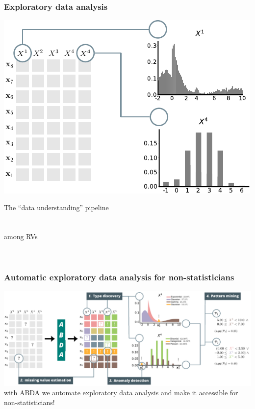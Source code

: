 \documentclass[xcolor={usenames,dvipsnames,svgnames}, compress, aspectratio=169, 11pt]{beamer}
\begin{document}
\begin{frame}[t, htt=bgrey2]
  \frametitle{Exploratory data analysis}

  \large
  \begin{minipage}[t]{0.6\linewidth}
    \includegraphics[width=.99\linewidth]{figures/abda-hist-type}
  \end{minipage}\hfill\begin{minipage}[t]{0.4\linewidth}
    \vspace{-150pt}
    {The ``data understanding'' pipeline}\\[5pt]
    \\
    \\
     among
    RVs\\
    \\
    \\
  \end{minipage}  
\end{frame}


\begin{frame}[t, htt=mpigreen]
  \frametitle{Automatic exploratory data analysis for non-statisticians}

  \includegraphics[width=1.04\linewidth]{figures/abda-full}\\

  with ABDA we automate exploratory data analysis and make it
  accessible for non-statisticians!
  
\end{frame}
\end{document}
